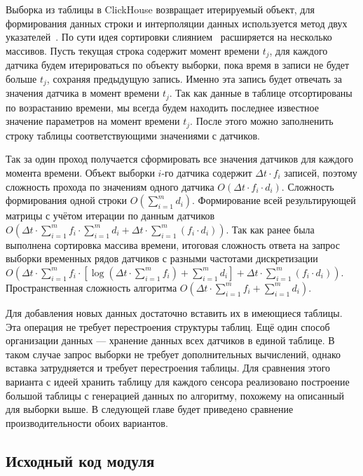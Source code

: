 Выборка из таблицы в ClickHouse возвращает итерируемый объект, для формирования данных строки и интерполяции данных используется метод двух указателей~\cite{two-pointers}. По сути идея сортировки слиянием~\cite{mergesort} расширяется на несколько массивов. Пусть текущая строка содержит момент времени $t_j$, для каждого датчика будем итерироваться по объекту выборки, пока время в записи не будет больше $t_j$, сохраняя предыдущую запись. Именно эта запись будет отвечать за значения датчика в момент времени $t_j$. Так как данные в таблице отсортированы по возрастанию времени, мы всегда будем находить последнее известное значение параметров на момент времени $t_j$. После этого можно заполненить строку таблицы соответствующими значениями с датчиков.

Так за один проход получается сформировать все значения датчиков для каждого момента времени. Объект выборки $i$-го датчика содержит ${\Delta}t \cdot f_i$ записей, поэтому сложность прохода по значениям одного датчика $O({\Delta}t \cdot f_i \cdot d_i)$. Сложность формирования одной строки $O(\sum^{m}_{i=1}{d_i})$. Формирование всей результирующей матрицы с учётом итерации по данным датчиков $O({\Delta}t \cdot \sum^{m}_{i=1}{f_i} \cdot \sum^{m}_{i=1}{d_i} + {\Delta}t \cdot \sum^{m}_{i=1}{(f_i \cdot d_i)})$. Так как ранее была выполнена сортировка массива времени, итоговая сложность ответа на запрос выборки временных рядов датчиков с разными частотами дискретизации $O({\Delta}t \cdot \sum^{m}_{i=1}{f_i} \cdot [\log({\Delta}t \cdot \sum^{m}_{i=1}{f_i}) + \sum^{m}_{i=1}{d_i}] + {\Delta}t \cdot \sum^{m}_{i=1}{(f_i \cdot d_i)})$. Пространственная сложность алгоритма $O({\Delta}t \cdot \sum^{m}_{i=1}{f_i} + \sum^{m}_{i=1}{d_i})$.

Для добавления новых данных достаточно вставить их в имеющиеся таблицы. Эта операция не требует перестроения структуры таблиц. Ещё один способ организации данных --- хранение данных всех датчиков в единой таблице. В таком случае запрос выборки не требует дополнительных вычислений, однако вставка затрудняется и требует перестроения таблицы. Для сравнения этого варианта с идеей хранить таблицу для каждого сенсора реализовано построение большой таблицы с генерацией данных по алгоритму, похожему на описанный для выборки выше. В следующей главе будет приведено сравнение производительности обоих вариантов.

\subsection{Исходный код модуля}

